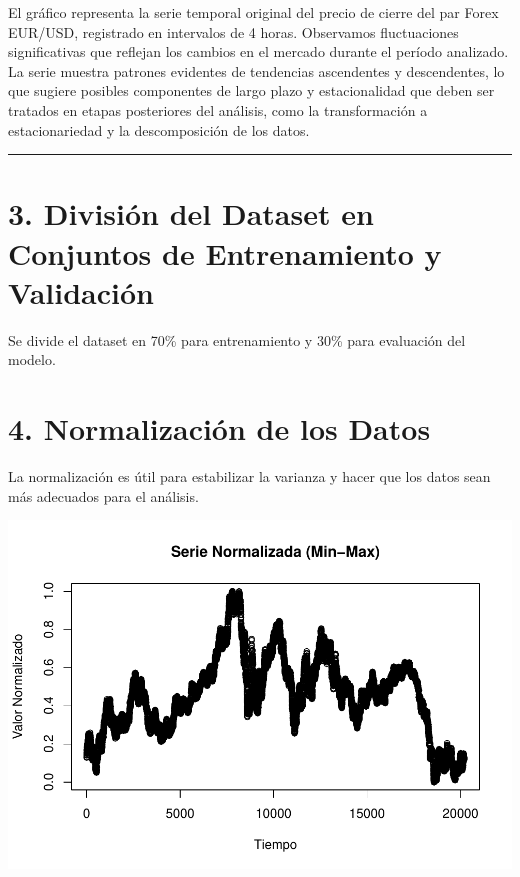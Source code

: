 \documentclass[
]{book}
\begin{document}
El gráfico representa la serie temporal original del precio de cierre del par Forex EUR/USD, registrado en intervalos de 4 horas. Observamos fluctuaciones significativas que reflejan los cambios en el mercado durante el período analizado. La serie muestra patrones evidentes de tendencias ascendentes y descendentes, lo que sugiere posibles componentes de largo plazo y estacionalidad que deben ser tratados en etapas posteriores del análisis, como la transformación a estacionariedad y la descomposición de los datos.

\begin{center}\rule{0.5\linewidth}{0.5pt}\end{center}

\section{3. División del Dataset en Conjuntos de Entrenamiento y Validación}\label{divisiuxf3n-del-dataset-en-conjuntos-de-entrenamiento-y-validaciuxf3n}

Se divide el dataset en 70\% para entrenamiento y 30\% para evaluación del modelo.

\section{4. Normalización de los Datos}\label{normalizaciuxf3n-de-los-datos}

La normalización es útil para estabilizar la varianza y hacer que los datos sean más adecuados para el análisis.

\includegraphics{bookdown_time_series_files/figure-latex/normalize-data-1.pdf}
\end{document}

